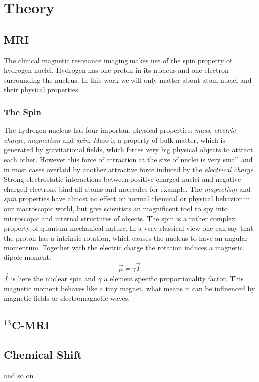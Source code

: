%
%
%

\section{Theory}



\subsection{MRI}
The clinical magnetic resonance imaging makes use of the spin property of hydrogen nuclei. Hydrogen has one proton in its nucleus and one electron surrounding the nucleus. In this work we will only matter about atom nuclei and their physical properties.

\subsubsection{The Spin}
The hydrogen nucleus has four important physical properties: \textit{mass}, \textit{electric charge}, \textit{magnetism} and \textit{spin}. 
\textit{Mass} is a property of bulk matter, which is generated by gravitational fields, which forces very big physical objects to attract each other. However this force of attraction at the size of nuclei is very small and in most cases overlaid by another attractive force induced by the \textit{electrical charge}. Strong electrostatic interactions between positive charged nuclei and negative charged electrons bind all atoms and molecules for example. The \textit{magnetism} and \textit{spin} properties have almost no effect on normal chemical or physical behavior in our macroscopic world, but give scientists an magnificent tool to spy into microscopic and internal structures of objects.
The spin is a rather complex property of quantum mechanical nature. In a very classical view one can say that the proton has a intrinsic rotation, which causes the nucleus to have an angular momentum. Together with the electric charge the rotation induces a magnetic dipole moment:
\begin{equation}
\vec{\mu} = \gamma \vec{I}
\end{equation}
$\vec{I}$ is here the nuclear spin and $\gamma$ a element specific proportionality factor. This magnetic moment behaves like a tiny magnet, what means it can be influenced by magnetic fields or electromagnetic waves. 




\subsection{$^{13}$C-MRI}
\subsection{Chemical Shift}

and so on